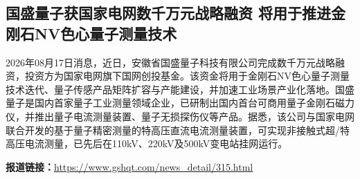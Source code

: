 \documentclass[12pt,a4paper]{ctexart}
\begin{document}
\subsection{ 国盛量子获国家电网数千万元战略融资 将用于推进金刚石NV色心量子测量技术 }

2026年08月17日消息，近日，安徽省国盛量子科技有限公司完成数千万元战略融资，投资方为国家电网旗下国网创投基金。该资金将用于金刚石NV色心量子测量技术迭代、量子传感产品矩阵扩容与产能建设，并加速工业场景产业化落地。国盛量子是国内首家量子工业测量领域企业，已研制出国内首台可商用量子金刚石磁力仪，并推出量子电流测量装置、量子无损探伤仪等产品。据悉，该公司与国家电网联合开发的基于量子精密测量的特高压直流电流测量装置，可实现非接触式超/特高压电流测量，已先后在110kV、220kV及500kV变电站挂网运行。

\noindent\textbf{报道链接：}\url{https://www.gshqt.com/news\_detail/315.html}
\end{document}
